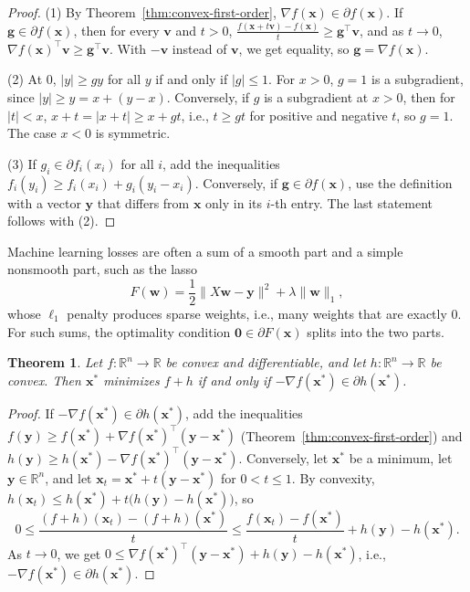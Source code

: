 \documentclass[11pt]{article}
\newcommand{\norm}[1]{\lVert #1 \rVert}
\theoremstyle{definition}
\theoremstyle{plain}
\newtheorem{theorem}[definition]{Theorem}
\theoremstyle{remark}
\begin{document}
\begin{proof}
    (1) By Theorem~\ref{thm:convex-first-order}, $\nabla f(\mathbf{x}) \in \partial f(\mathbf{x})$. If $\mathbf{g} \in \partial f(\mathbf{x})$, then for every $\mathbf{v}$ and $t > 0$, $\frac{f(\mathbf{x} + t\mathbf{v}) - f(\mathbf{x})}{t} \geq \mathbf{g}^\top\mathbf{v}$, and as $t \to 0$, $\nabla f(\mathbf{x})^\top\mathbf{v} \geq \mathbf{g}^\top\mathbf{v}$. With $-\mathbf{v}$ instead of $\mathbf{v}$, we get equality, so $\mathbf{g} = \nabla f(\mathbf{x})$.

    (2) At $0$, $|y| \geq gy$ for all $y$ if and only if $|g| \leq 1$. For $x > 0$, $g = 1$ is a subgradient, since $|y| \geq y = x + (y - x)$. Conversely, if $g$ is a subgradient at $x > 0$, then for $|t| < x$, $x + t = |x + t| \geq x + gt$, i.e., $t \geq gt$ for positive and negative $t$, so $g = 1$. The case $x < 0$ is symmetric.

    (3) If $g_i \in \partial f_i(x_i)$ for all $i$, add the inequalities $f_i(y_i) \geq f_i(x_i) + g_i(y_i - x_i)$. Conversely, if $\mathbf{g} \in \partial f(\mathbf{x})$, use the definition with a vector $\mathbf{y}$ that differs from $\mathbf{x}$ only in its $i$-th entry. The last statement follows with (2).
\end{proof}

Machine learning losses are often a sum of a smooth part and a simple nonsmooth part, such as the lasso
\[F(\mathbf{w}) = \frac{1}{2}\norm{X\mathbf{w} - \mathbf{y}}^2 + \lambda\norm{\mathbf{w}}_1,\]
whose $\ell_1$ penalty produces sparse weights, i.e., many weights that are exactly $0$. For such sums, the optimality condition $\mathbf{0} \in \partial F(\mathbf{x})$ splits into the two parts.

\begin{theorem}\label{thm:composite-optimality}
    Let $f: \mathbb{R}^n \to \mathbb{R}$ be convex and differentiable, and let $h: \mathbb{R}^n \to \mathbb{R}$ be convex. Then $\mathbf{x}^*$ minimizes $f + h$ if and only if $-\nabla f(\mathbf{x}^*) \in \partial h(\mathbf{x}^*)$.
\end{theorem}

\begin{proof}
    If $-\nabla f(\mathbf{x}^*) \in \partial h(\mathbf{x}^*)$, add the inequalities $f(\mathbf{y}) \geq f(\mathbf{x}^*) + \nabla f(\mathbf{x}^*)^\top(\mathbf{y} - \mathbf{x}^*)$ (Theorem~\ref{thm:convex-first-order}) and $h(\mathbf{y}) \geq h(\mathbf{x}^*) - \nabla f(\mathbf{x}^*)^\top(\mathbf{y} - \mathbf{x}^*)$. Conversely, let $\mathbf{x}^*$ be a minimum, let $\mathbf{y} \in \mathbb{R}^n$, and let $\mathbf{x}_t = \mathbf{x}^* + t(\mathbf{y} - \mathbf{x}^*)$ for $0 < t \leq 1$. By convexity, $h(\mathbf{x}_t) \leq h(\mathbf{x}^*) + t\big(h(\mathbf{y}) - h(\mathbf{x}^*)\big)$, so
    \[0 \leq \frac{(f + h)(\mathbf{x}_t) - (f + h)(\mathbf{x}^*)}{t} \leq \frac{f(\mathbf{x}_t) - f(\mathbf{x}^*)}{t} + h(\mathbf{y}) - h(\mathbf{x}^*).\]
    As $t \to 0$, we get $0 \leq \nabla f(\mathbf{x}^*)^\top(\mathbf{y} - \mathbf{x}^*) + h(\mathbf{y}) - h(\mathbf{x}^*)$, i.e., $-\nabla f(\mathbf{x}^*) \in \partial h(\mathbf{x}^*)$.
\end{proof}
\end{document}

